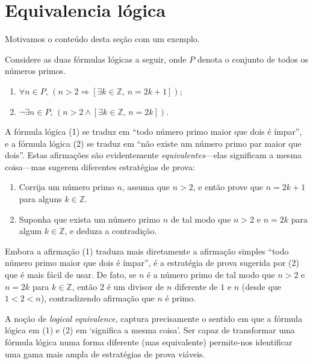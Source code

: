 \section{Equivalencia lógica}

Motivamos o conteúdo desta seção com um exemplo.

\begin{example}
\label{exNoEvenPrimeGreaterThanTwo}
Considere as duas fórmulas lógicas a seguir, onde $P$ denota o conjunto de todos os números primos.
\begin{enumerate}[(1)]
\item $\forall n \in P,\, (n > 2 \Rightarrow [\exists k \in \mathbb{Z},\, n=2k+1])$;
\item $\neg \exists n \in P,\, (n > 2 \wedge [\exists k \in \mathbb{Z},\, n=2k])$.
\end{enumerate}
A fórmula lógica (1) se traduz em “todo número primo maior que dois é ímpar”, e a fórmula lógica (2) se traduz em “não existe um número primo par maior que dois”. Estas afirmações são evidentemente \textit{equivalentes}---elas significam a mesma coisa---mas sugerem diferentes estratégias de prova:

\begin{enumerate}[(1)]
\item Corrija um número primo $n$, assuma que $n>2$, e então prove que $n = 2k+1$ para alguns $k \in \mathbb{Z}$.
\item Suponha que exista um número primo $n$ de tal modo que $n>2$ e $n=2k$ para algum $k \in \mathbb{Z}$, e deduza a contradição.
\end{enumerate}

Embora a afirmação (1) traduza mais diretamente a afirmação simples “todo número primo maior que dois é ímpar”, é a estratégia de prova sugerida por (2) que é mais fácil de usar. De fato, se $n$ é a número primo de tal modo que $n>2$ e $n=2k$ para $k \in \mathbb{Z}$, então $2$ é um divisor de $n$ diferente de $1$ e $n$ (desde que $1<2<n$), contradizendo afirmação que $n$ é primo.
\end{example}

A noção de \textit{logical equivalence}, captura precisamente o sentido em que a fórmula lógica em (1) e (2) em  `significa a mesma coisa'. Ser capaz de transformar uma fórmula lógica numa forma diferente (mas equivalente) permite-nos identificar uma gama mais ampla de estratégias de prova viáveis.

